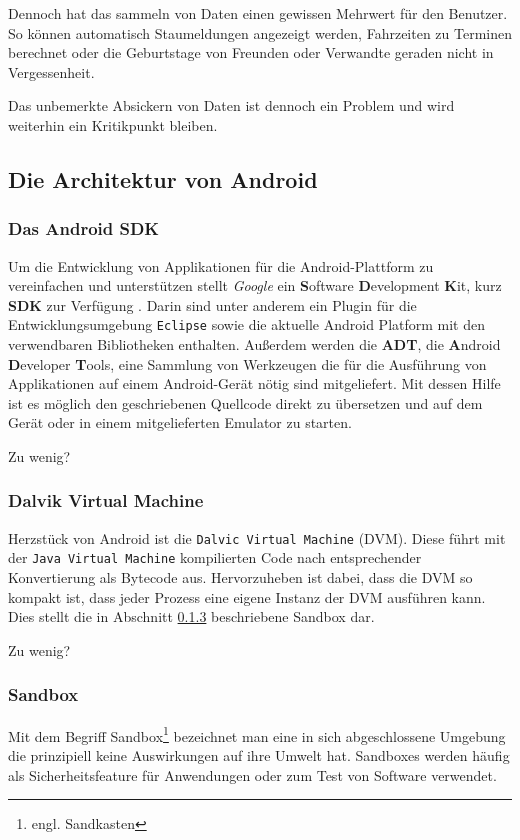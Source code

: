 Dennoch hat das sammeln von Daten einen gewissen Mehrwert für den Benutzer. So können automatisch Staumeldungen angezeigt werden, Fahrzeiten zu Terminen berechnet oder die Geburtstage von Freunden oder Verwandte geraden nicht in Vergessenheit.

Das unbemerkte Absickern von Daten ist dennoch ein Problem und wird weiterhin ein Kritikpunkt bleiben.


\subsection{Die Architektur von Android}

\subsubsection{Das Android SDK}

Um die Entwicklung von Applikationen für die Android-Plattform zu vereinfachen und unterstützen stellt \emph{Google} ein \textbf{S}oftware \textbf{D}evelopment \textbf{K}it, kurz \textbf{SDK} zur Verfügung \cite{android_sdk}. Darin sind unter anderem ein Plugin für die Entwicklungsumgebung \verb+Eclipse+ sowie die aktuelle Android Platform mit den verwendbaren Bibliotheken enthalten. Außerdem werden die \textbf{ADT}, die \textbf{A}ndroid \textbf{D}eveloper \textbf{T}ools, eine Sammlung von Werkzeugen die für die Ausführung von Applikationen auf einem Android-Gerät nötig sind mitgeliefert. Mit dessen Hilfe ist es möglich den geschriebenen Quellcode direkt zu übersetzen und auf dem Gerät oder in einem mitgelieferten Emulator zu starten.

Zu wenig?

\subsubsection{Dalvik Virtual Machine}
Herzstück von Android ist die \verb+Dalvic Virtual Machine+ (DVM). Diese führt mit der \verb+Java Virtual Machine+ kompilierten Code nach entsprechender Konvertierung als Bytecode aus. Hervorzuheben ist dabei, dass die DVM so kompakt ist, dass jeder Prozess eine eigene Instanz der DVM ausführen kann. Dies stellt die in Abschnitt \ref{sandbox} beschriebene Sandbox dar.

Zu wenig?

\subsubsection{Sandbox}
\label{sandbox}
Mit dem Begriff Sandbox\footnote{engl. Sandkasten} bezeichnet man eine in sich abgeschlossene Umgebung die prinzipiell keine Auswirkungen auf ihre Umwelt hat. Sandboxes werden häufig als Sicherheitsfeature für Anwendungen oder zum Test von Software verwendet.

